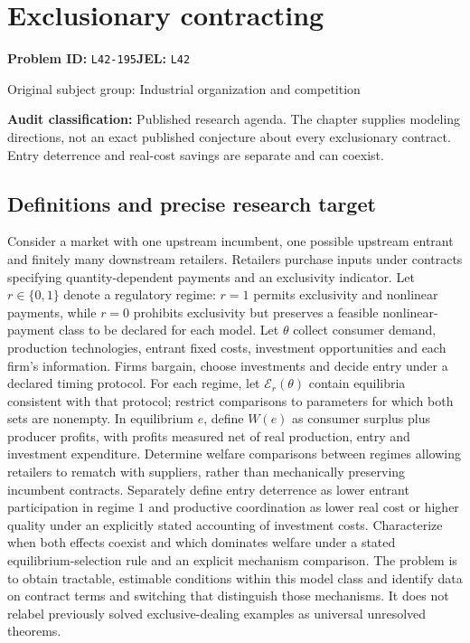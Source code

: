 \documentclass[11pt,a4paper]{article}
\begin{document}
\section*{Exclusionary contracting}
\textbf{Problem ID:} \texttt{L42-195}\quad \textbf{JEL:} \texttt{L42}\par
\label{problem:OP-0399}
{\sffamily\small\color{muted}Original subject group: Industrial organization and competition\par}
\label{definitions:problem:30007681}
\textbf{Audit classification:} Published research agenda. The chapter supplies modeling directions, not an exact published conjecture about every exclusionary contract. Entry deterrence and real-cost savings are separate and can coexist.
\subsection*{Definitions and precise research target}
Consider a market with one upstream incumbent, one possible upstream entrant and finitely many downstream retailers. Retailers purchase inputs under contracts specifying quantity-dependent payments and an exclusivity indicator. Let \(r\in\{0,1\}\) denote a regulatory regime: \(r=1\) permits exclusivity and nonlinear payments, while \(r=0\) prohibits exclusivity but preserves a feasible nonlinear-payment class to be declared for each model. Let \(\theta\) collect consumer demand, production technologies, entrant fixed costs, investment opportunities and each firm's information. Firms bargain, choose investments and decide entry under a declared timing protocol. For each regime, let \(\mathcal E_r(\theta)\) contain equilibria consistent with that protocol; restrict comparisons to parameters for which both sets are nonempty. In equilibrium \(e\), define \(W(e)\) as consumer surplus plus producer profits, with profits measured net of real production, entry and investment expenditure. Determine welfare comparisons between regimes allowing retailers to rematch with suppliers, rather than mechanically preserving incumbent contracts. Separately define entry deterrence as lower entrant participation in regime \(1\) and productive coordination as lower real cost or higher quality under an explicitly stated accounting of investment costs. Characterize when both effects coexist and which dominates welfare under a stated equilibrium-selection rule and an explicit mechanism comparison. The problem is to obtain tractable, estimable conditions within this model class and identify data on contract terms and switching that distinguish those mechanisms. It does not relabel previously solved exclusive-dealing examples as universal unresolved theorems.
\end{document}
